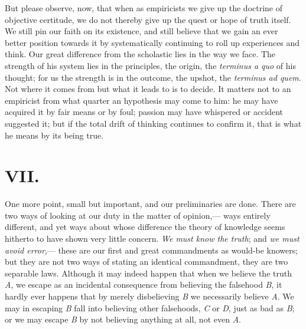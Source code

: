 \documentclass[12pt]{article}
\begin{document}
But please observe, now, that when as empiricists we give up the doctrine of objective certitude, we do not thereby give up the quest or hope of truth itself.  We still pin our faith on its existence, and still believe that we gain an ever better position towards it by systematically continuing to roll up experiences and think.  Our great difference from the scholastic lies in the way we face.  The strength of his system lies in the principles, the origin, the \emph{terminus a quo} of his thought; for us the strength is in the outcome, the upshot, the \emph{terminus ad quem}.  Not where it comes from but what it leads to is to decide.  It matters not to an empiricist from what quarter an hypothesis may come to him: he may have acquired it by fair means or by foul; passion may have whispered or accident suggested it; but if the total drift of thinking continues to confirm it, that is what he means by its being true.

\section*{VII.}

One more point, small but important, and our preliminaries are done. There are two ways of looking at our duty in the matter of opinion,--- ways entirely different, and yet ways about whose difference the theory of knowledge seems hitherto to have shown very little concern.  \emph{We must know the truth}; and \emph{we must avoid error},--- these are our first and great commandments as would-be knowers; but they are not two ways of stating an identical commandment, they are two separable laws.  Although it may indeed happen that when we believe the truth \emph{A}, we escape  as an incidental consequence from believing the falsehood \emph{B}, it hardly ever happens that by merely disbelieving \emph{B} we necessarily believe \emph{A}.  We may in escaping \emph{B} fall into believing other falsehoods, \emph{C} or \emph{D}, just as bad as \emph{B}; or we may escape \emph{B} by not believing anything at all, not even \emph{A}.
\end{document}
